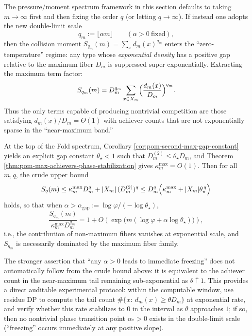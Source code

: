 \begin{remark}[Double-limit scale $q=\alpha m$: immediate freezing and auditable criterion]\label{rem:pom-q-alpha-m-freeze}
The pressure/moment spectrum framework in this section defaults to taking $m\to\infty$ first and then fixing the order $q$ (or letting $q\to\infty$). If instead one adopts the new double-limit scale
\[
q_m:=\lfloor \alpha m\rfloor\qquad(\alpha>0\ \text{fixed}),
\]
then the collision moment
\(
S_{q_m}(m)=\sum_x d_m(x)^{q_m}
\)
enters the ``zero-temperature'' regime: any type whose \emph{exponential density} has a positive gap relative to the maximum fiber \(D_m\) is suppressed super-exponentially.
Extracting the maximum term factor:
\[
S_{q_m}(m)
=D_m^{q_m}\sum_{x\in X_m}\Bigl(\frac{d_m(x)}{D_m}\Bigr)^{q_m}.
\]
Thus the only terms capable of producing nontrivial competition are those satisfying \(d_m(x)/D_m=\Theta(1)\) with achiever counts that are not exponentially sparse in the ``near-maximum band.''
\par
At the top of the Fold spectrum, Corollary \ref{cor:pom-second-max-gap-constant} yields an explicit gap constant \(\theta_\star<1\) such that
\(
D_m^{(2)}\le \theta_\star D_m
\), and Theorem \ref{thm:pom-max-achievers-phase-stabilization} gives \(\kappa_m^{\mathrm{max}}=O(1)\).
Then for all \(m,q\), the crude upper bound
\[
S_q(m)\le \kappa_m^{\mathrm{max}}D_m^q+|X_m|\,(D_m^{(2)})^q
\le D_m^q\Bigl(\kappa_m^{\mathrm{max}}+|X_m|\theta_\star^{\,q}\Bigr)
\]
holds, so that when \(\alpha>\alpha_{\mathrm{gap}}:=\log\varphi/(-\log\theta_\star)\),
\[
\frac{S_{q_m}(m)}{\kappa_m^{\mathrm{max}}D_m^{q_m}}=1+O\!\left(\exp\!\bigl(m(\log\varphi+\alpha\log\theta_\star)\bigr)\right),
\]
i.e., the contribution of non-maximum fibers vanishes at exponential scale, and $S_{q_m}$ is necessarily dominated by the maximum fiber family.
\par
The stronger assertion that ``any \(\alpha>0\) leads to immediate freezing'' does not automatically follow from the crude bound above: it is equivalent to the achiever count in the near-maximum tail remaining sub-exponential as $\theta\uparrow 1$.
This provides a direct auditable experimental protocol: within the computable window, use residue DP to compute the tail count
\(
\#\{x:\ d_m(x)\ge \theta D_m\}
\)
at exponential rate, and verify whether this rate stabilizes to $0$ in the interval as $\theta$ approaches $1$; if so, then no nontrivial phase transition point \(\alpha_\ast>0\) exists in the double-limit scale (``freezing'' occurs immediately at any positive slope).
\end{remark}

